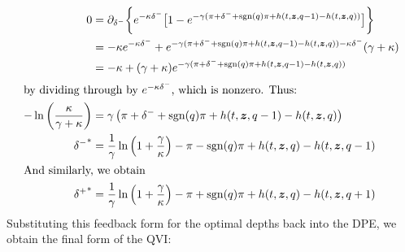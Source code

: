 \begin{subequations}
\begin{align}
\label{eq:optdepthfeedbackcase2}
0 & = \partial_{\delta^-}\biggl\lbrace e^{ -\kappa \delta^{-}} \bigl[ 1 - e^{-\gamma(\pi + \delta^- + \operatorname{\mathrm{sgn}}(q)\pi + h(t,\bm{z},q-1) - h(t,\bm{z},q))} \bigr] \biggr\rbrace \nonumber \\
& = -\kappa e^{ -\kappa \delta^{-}} + e^{-\gamma(\pi + \delta^- + \operatorname{\mathrm{sgn}}(q)\pi + h(t,\bm{z},q-1) - h(t,\bm{z},q)) -\kappa \delta^-} (\gamma + \kappa) \nonumber \\
& = -\kappa + ( \gamma + \kappa ) e^{-\gamma(\pi + \delta^- + \operatorname{\mathrm{sgn}}(q)\pi + h(t,\bm{z},q-1) - h(t,\bm{z},q))} \nonumber \\
\intertext{by dividing through by $e^{-\kappa \delta^-}$, which is nonzero. Thus:}
-\ln\left( \frac{\kappa}{\gamma + \kappa} \right) & = \gamma \left( \pi + \delta^- + \operatorname{\mathrm{sgn}}(q)\pi + h(t,\bm{z},q-1) - h(t,\bm{z},q) \right) \nonumber \\
{\delta^-}^* & = \frac{1}{\gamma} \ln \left( 1 + \frac{\gamma}{\kappa}\right) - \pi - \operatorname{\mathrm{sgn}}(q)\pi + h(t,\bm{z},q) - h(t,\bm{z},q-1) \\
\intertext{And similarly, we obtain}
{\delta^+}^* & = \frac{1}{\gamma} \ln \left( 1 + \frac{\gamma}{\kappa}\right) - \pi + \operatorname{\mathrm{sgn}}(q)\pi + h(t,\bm{z},q) - h(t,\bm{z},q+1)
\end{align}
\end{subequations}
Substituting this feedback form for the optimal depths back into the DPE, we obtain the final form of the QVI:
